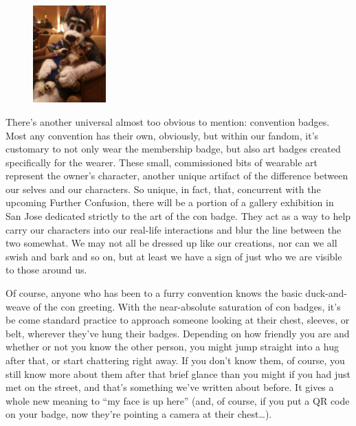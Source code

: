 \begin{figure}
  \begin{center}
    \includegraphics[width=0.25\textwidth]{content/assets/convention-mystique--plush}
  \end{center}
\end{figure}
There's another universal almost too obvious to mention: convention badges.  Most any convention has their own, obviously, but within our fandom, it's customary to not only wear the membership badge, but also art badges created specifically for the wearer.  These small, commissioned bits of wearable art represent the owner's character, another unique artifact of the difference between our selves and our characters.  So unique, in fact, that, concurrent with the upcoming Further Confusion, there will be a portion of a gallery exhibition in San Jose dedicated strictly to the art of the con badge.  They act as a way to help carry our characters into our real-life interactions and blur the line between the two somewhat.  We may not all be dressed up like our creations, nor can we all swish and bark and so on, but at least we have a sign of just who we are visible to those around us.

Of course, anyone who has been to a furry convention knows the basic duck-and-weave of the con greeting.  With the near-absolute saturation of con badges, it's be come standard practice to approach someone looking at their chest, sleeves, or belt, wherever they've hung their badges.  Depending on how friendly you are and whether or not you know the other person, you might jump straight into a hug after that, or start chattering right away.  If you don't know them, of course, you still know more about them after that brief glance than you might if you had just met on the street, and that's something we've written about before.  It gives a whole new meaning to “my face is up here” (and, of course, if you put a QR code on your badge, now they're pointing a camera at their chest\ldots).

